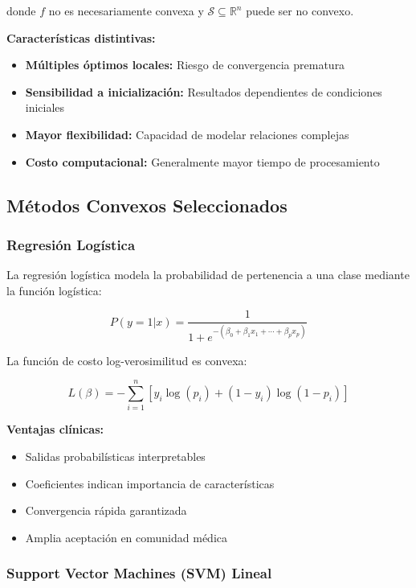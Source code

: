 \documentclass[12pt,a4paper]{article}
\begin{document}
donde $f$ no es necesariamente convexa y $\mathcal{S} \subseteq \mathbb{R}^n$ puede ser no convexo.

\textbf{Características distintivas:}
\begin{itemize}
    \item \textbf{Múltiples óptimos locales:} Riesgo de convergencia prematura
    \item \textbf{Sensibilidad a inicialización:} Resultados dependientes de condiciones iniciales
    \item \textbf{Mayor flexibilidad:} Capacidad de modelar relaciones complejas
    \item \textbf{Costo computacional:} Generalmente mayor tiempo de procesamiento
\end{itemize}

\subsection{Métodos Convexos Seleccionados}

\subsubsection{Regresión Logística}

La regresión logística modela la probabilidad de pertenencia a una clase mediante la función logística:

\begin{equation}
P(y=1|x) = \frac{1}{1 + e^{-(\beta_0 + \beta_1 x_1 + \cdots + \beta_p x_p)}}
\end{equation}

La función de costo log-verosimilitud es convexa:

\begin{equation}
L(\beta) = -\sum_{i=1}^{n} [y_i \log(p_i) + (1-y_i) \log(1-p_i)]
\end{equation}

\textbf{Ventajas clínicas:}
\begin{itemize}
    \item Salidas probabilísticas interpretables
    \item Coeficientes indican importancia de características
    \item Convergencia rápida garantizada
    \item Amplia aceptación en comunidad médica
\end{itemize}

\subsubsection{Support Vector Machines (SVM) Lineal}
\end{document}
